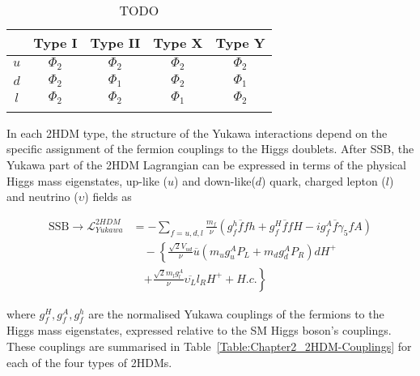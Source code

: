 \begin{table}[h]
\centering
\renewcommand{\arraystretch}{1.5} %
\setlength{\tabcolsep}{12pt} %
\begin{tabular}{|c|c|c|c|c|}
\hline
    & Type I   & Type II  & Type X   & Type Y   \\ \hline \hline
$u$ & $\Phi_2$ & $\Phi_2$ & $\Phi_2$ & $\Phi_2$ \\ 
\arrayrulecolor{lightgray} \hline
$d$ & $\Phi_2$ & $\Phi_1$ & $\Phi_2$ & $\Phi_1$ \\ 
\arrayrulecolor{lightgray} \hline
$l$ & $\Phi_2$ & $\Phi_2$ & $\Phi_1$ & $\Phi_2$ \\ 
\arrayrulecolor{black} \hline
\end{tabular}
\caption{TODO}
\label{Table:Chapter2_2HDM-Types}
\end{table}

In each 2HDM type, the structure of the Yukawa interactions depend on the specific assignment of the fermion couplings to the Higgs doublets. After SSB, the Yukawa part of the 2HDM Lagrangian can be expressed in terms of the physical Higgs mass eigenstates, up-like ($u$) and down-like($d$) quark, charged lepton ($l$) and neutrino ($\upsilon$) fields as

\begin{equation}
\begin{aligned}
    \text{SSB} \rightarrow \mathcal{L}_{Yukawa}^{2HDM} &= - \sum\limits_{f=u,d,l} \frac{m_f}{\nu} 
    \left(g_f^h \overline{f}f h + g_f^H\overline{f}f H - i g_f^A\overline{f} \gamma_5 f A \right) \\
    &\quad - \left\{ \frac{\sqrt{2}V_{ud}}{\nu} \overline{u} 
    \left(m_u g_u^A P_L + m_d g_d^A P_R \right) d H^+ \right. \\
    &\quad \left. + \frac{\sqrt{2}m_l g_{l}^A}{\nu} \overline{\upsilon
_L} l_R H^+ + H.c. \right\}
\end{aligned}
\label{Equation:Chapter2_2HDM-YukawaLagrangian}
\end{equation}

where $g_f^H,g_f^A,g_f^h$ are the normalised Yukawa couplings of the fermions to the Higgs mass eigenstates, expressed relative to the SM Higgs boson's couplings. These couplings are summarised in Table~\ref{Table:Chapter2_2HDM-Couplings} for each of the four types of 2HDMs.


